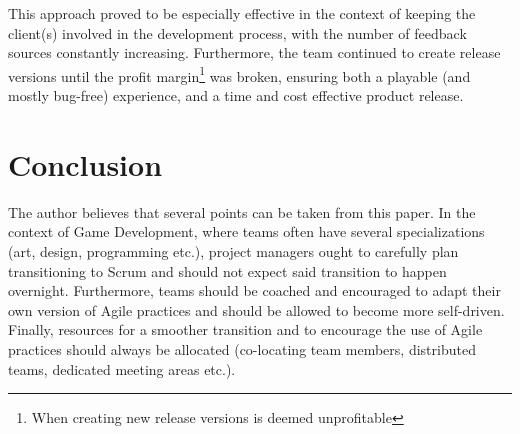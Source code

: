 \documentclass{scrartcl}
\begin{document}
    This approach proved to be especially effective in the context of keeping the client(s) involved in the development process, with the number of feedback sources constantly increasing. Furthermore, the team continued to create release versions until the profit margin\footnote{When creating new release versions is deemed unprofitable} was broken, ensuring both a playable (and mostly bug-free) experience, and a time and cost effective product release.
    
    \section{Conclusion}
    
    The author believes that several points can be taken from this paper. In the context of Game Development, where teams often have several specializations (art, design, programming etc.), project managers ought to carefully plan transitioning to Scrum and should not expect said transition to happen overnight. Furthermore, teams should be coached and encouraged to adapt their own version of Agile practices and should be allowed to become more self-driven. Finally, resources for a smoother transition and to encourage the use of Agile practices should always be allocated (co-locating team members, distributed teams, dedicated meeting areas etc.).

\printbibliography
\end{document}
